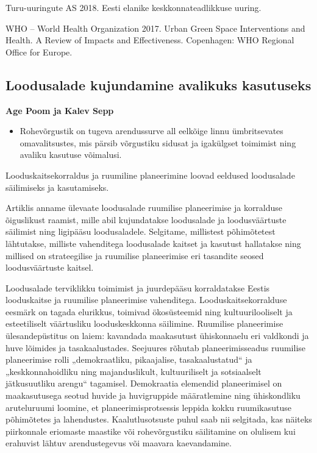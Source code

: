 \documentclass[estonian,]{article}
\providecommand{\tightlist}{%
  \setlength{\itemsep}{0pt}\setlength{\parskip}{0pt}}
\begin{document}
Turu-uuringute AS 2018. Eesti elanike keskkonnateadlikkuse uuring.

WHO -- World Health Organization 2017. Urban Green Space Interventions and Health. A Review of Impacts and Effectiveness. Copenhagen: WHO Regional Office for Europe.

\hypertarget{loodusalade-kujundamine-avalikuks-kasutuseks}{%
\subsection{Loodusalade kujundamine avalikuks kasutuseks}\label{loodusalade-kujundamine-avalikuks-kasutuseks}}

\begin{authors}
\textbf{Age Poom ja Kalev Sepp}
\end{authors}

\begin{points}
\begin{itemize}
\tightlist
\item
  Rohevõrgustik on tugeva arendussurve all eelkõige linnu ümbritsevates
  omavalitsustes, mis pärsib võrgustiku sidusat ja igakülgset toimimist
  ning avaliku kasutuse võimalusi.
\end{itemize}
\end{points}

\begin{blockquote-right}
Looduskaitsekorraldus ja ruumiline planeerimine loovad eeldused
loodusalade säilimiseks ja kasutamiseks.
\end{blockquote-right}

Artiklis anname ülevaate loodusalade ruumilise planeerimise ja korralduse õiguslikust raamist, mille abil kujundatakse loodusalade ja loodusväärtuste säilimist ning ligipääsu loodusaladele. Selgitame, millistest põhimõtetest lähtutakse, milliste vahenditega loodusalade kaitset ja kasutust hallatakse ning millised on strateegilise ja ruumilise planeerimise eri tasandite seosed loodusväärtuste kaitsel.

Loodusalade terviklikku toimimist ja juurdepääsu korraldatakse Eestis looduskaitse ja ruumilise planeerimise vahenditega. Looduskaitsekorralduse eesmärk on tagada elurikkus, toimivad ökosüsteemid ning kultuurilooliselt ja esteetiliselt väärtusliku looduskeskkonna säilimine. Ruumilise planeerimise ülesandepüstitus on laiem: kavandada maakasutust ühiskonnaelu eri valdkondi ja huve lõimides ja tasakaalustades. Seejuures rõhutab planeerimisseadus ruumilise planeerimise rolli „demokraatliku, pikaajalise, tasakaalustatud`` ja „keskkonnahoidliku ning majanduslikult, kultuuriliselt ja sotsiaalselt jätkusuutliku arengu`` tagamisel. Demokraatia elemendid planeerimisel on maakasutusega seotud huvide ja huvigruppide määratlemine ning ühiskondliku aruteluruumi loomine, et planeerimisprotsessis leppida kokku ruumikasutuse põhimõtetes ja lahendustes. Kaalutlusotsuste puhul saab nii selgitada, kas näiteks piirkonnale eriomaste maastike või rohevõrgustiku säilitamine on olulisem kui erahuvist lähtuv arendustegevus või maavara kaevandamine.
\end{document}
